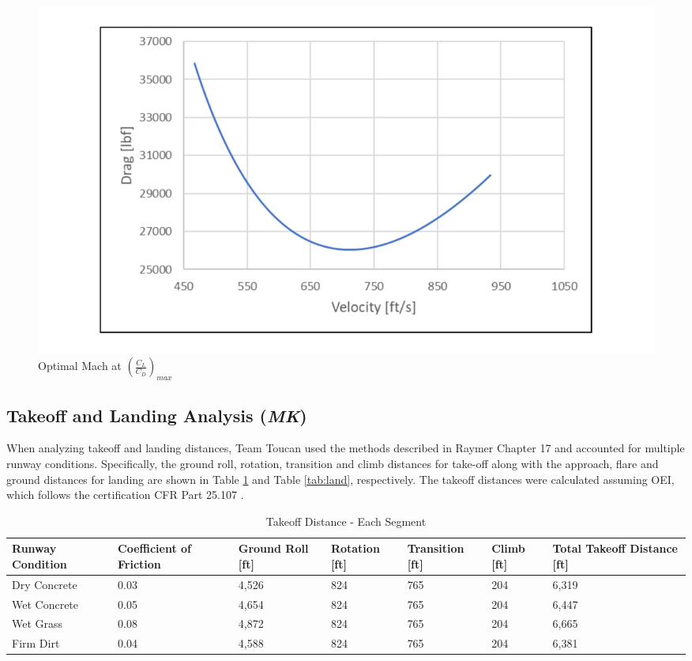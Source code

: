 \begin{figure}[!h]
    \centering
    \includegraphics[width=1.0\textwidth]{Photos/Optimal_Mach.pdf}
    \caption{Optimal Mach at $(\frac{C_{L}}{C_{D}})_{max}$}
    \label{optimach}
 \end{figure}

\subsection{Takeoff and Landing Analysis (\textit{MK})}
\qquad
When analyzing takeoff and landing distances, Team Toucan used the methods described in Raymer \cite{raymer} Chapter 17 and accounted for multiple runway conditions. Specifically, the ground roll, rotation, transition and climb distances for take-off along with the approach, flare and ground distances for landing are shown in Table \ref{tab:TO} and Table \ref{tab:land}, respectively. The takeoff distances were calculated assuming OEI, which follows the certification CFR Part 25.107 \cite{cfr}. 

\begin{table}[!h]
    \centering
    \caption{Takeoff Distance - Each Segment}
    \begin{tabular}{|p{.6in}|p{.8in}|p{.8in}|p{.6in}|p{.6in}|p{.6in}|p{.8in}|}\toprule 
    \textbf{Runway Condition} & \textbf{Coefficient of Friction \cite{raymer}} & \textbf{Ground Roll [ft]} & \textbf{Rotation [ft]} & \textbf{Transition [ft]} & \textbf{Climb [ft]} & \textbf{Total Takeoff Distance [ft]} \\ \hline 
    Dry \newline Concrete & 0.03 & 4,526 & 824 & 765 & 204 & 6,319 \\ \hline
    Wet \newline Concrete & 0.05 & 4,654 & 824 & 765 & 204 & 6,447\\ \hline
    Wet Grass & 0.08 & 4,872 & 824 & 765 & 204 & 6,665\\ \hline
    Firm Dirt & 0.04 & 4,588 & 824 & 765 & 204 & 6,381 \\ \bottomrule
    \end{tabular}
    \label{tab:TO}
\end{table}
\clearpage 

